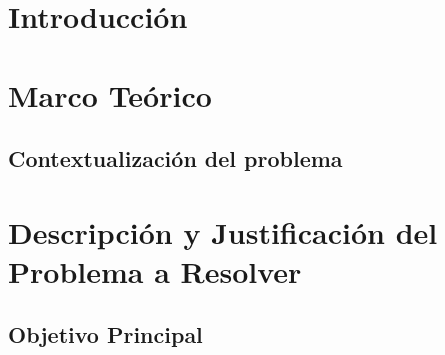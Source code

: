 \documentclass{article}
\begin{document}


\section{Introducción}\label{sec:intr}


\section{Marco Teórico}\label{sec:marc}



\subsection{Contextualización del problema}





\section{Descripción y Justificación del Problema a Resolver}\label{sec:descr}


\subsection{Objetivo Principal}


\end{document}
